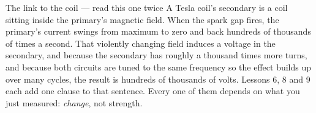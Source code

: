 \begin{telospanel}{The link to the coil --- read this one twice}
A Tesla coil's secondary is a coil sitting inside the primary's magnetic field.
When the spark gap fires, the primary's current swings from maximum to zero and
back hundreds of thousands of times a second. That violently changing field
induces a voltage in the secondary, and because the secondary has roughly a
thousand times more turns, and because both circuits are tuned to the same
frequency so the effect builds up over many cycles, the result is hundreds of
thousands of volts. Lessons 6, 8 and 9 each add one clause to that sentence.
Every one of them depends on what you just measured: \emph{change}, not
strength.
\end{telospanel}
\lowvoltagenote

